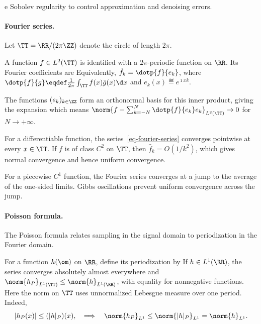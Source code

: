 e Sobolev regularity to control approximation and denoising errors.

   
\paragraph{Fourier series.}

Let $\TT=\RR/(2\pi\ZZ)$ denote the circle of length $2\pi$.
 
A function $f\in L^2(\TT)$ is identified with a $2\pi$-periodic function on $\RR$. Its Fourier coefficients are
Equivalently, $\hat f_k = \dotp{f}{e_k}$, where $\dotp{f}{g} \eqdef \frac{1}{2\pi} \int_\TT f(x) \bar g(x) \d x$ and $e_k(x) \eqdef e^{\imath x k}$.
 
The functions $(e_k)_{k\in\ZZ}$ form an orthonormal basis for this inner product, giving the expansion
which means $\norm{f-\sum_{k=-N}^N \dotp{f}{e_k} e_k}_{L^2(\TT)} \rightarrow 0$ for $N \rightarrow +\infty$.
 
For a differentiable function, the series~\eqref{eq-fourier-series} converges pointwise at every $x \in \TT$. If $f$ is of class $C^2$ on $\TT$, then $\hat f_k = O(1/k^2)$, which gives normal convergence and hence uniform convergence.
 
For a piecewise $C^1$ function, the Fourier series converges at a jump to the average of the one-sided limits. Gibbs oscillations prevent uniform convergence across the jump.


   
\paragraph{Poisson formula.}

The Poisson formula relates sampling in the signal domain to periodization in the Fourier domain.
 
For a function $h(\om)$ on $\RR$, define its periodization by
If $h \in L^1(\RR)$, the series converges absolutely almost everywhere and $\norm{h_P}_{L^1(\TT)} \leq \norm{h}_{L^1(\RR)}$, with equality for nonnegative functions. Here the norm on $\TT$ uses unnormalized Lebesgue measure over one period. Indeed,
$$
	|h_P(x)| \leq (|h|_P)(x), \quad\Longrightarrow\quad
	\norm{h_P}_{L^1} \leq  \norm{|h|_P}_{L^1} = \norm{h}_{L^1}. 
$$
 
